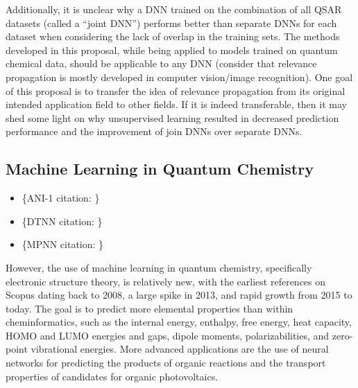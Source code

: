 \documentclass[12pt]{article}
\begin{document}
Additionally, it is unclear why a DNN trained on the combination of all QSAR datasets (called a ``joint DNN'') performs better than separate DNNs for each dataset when considering the lack of overlap in the training sets. The methods developed in this proposal, while being applied to models trained on quantum chemical data, should be applicable to any DNN (consider that relevance propagation is mostly developed in computer vision/image recognition). One goal of this proposal is to transfer the idea of relevance propagation from its original intended application field to other fields. If it is indeed transferable, then it may shed some light on why unsupervised learning resulted in decreased prediction performance and the improvement of join DNNs over separate DNNs.

\subsection{Machine Learning in Quantum Chemistry}
\label{sec:org5008123}

\begin{itemize}
\item \fxnote\{ANI-1 citation: \parencite{Smith_2017_3192}\}
\item \fxnote\{DTNN citation: \parencite{Schuett_2017_13890}\}
\item \fxnote\{MPNN citation: \parencite{2017arXiv170401212G}\}
\end{itemize}

However, the use of machine learning in quantum chemistry, specifically electronic structure theory, is relatively new, with the earliest references on Scopus dating back to 2008, a large spike in 2013, and rapid growth from 2015 to today. The goal is to predict more elemental properties than within cheminformatics, such as the internal energy, enthalpy, free energy, heat capacity, HOMO and LUMO energies and gaps, dipole moments, polarizabilities, and zero-point vibrational energies\cite{2015arXiv150204563R}. More advanced applications are the use of neural networks for predicting the products of organic reactions\cite{doi:10.1021/acscentsci.6b00219} and the transport properties of candidates for organic photovoltaics\cite{C5SC04786B}.
\end{document}
